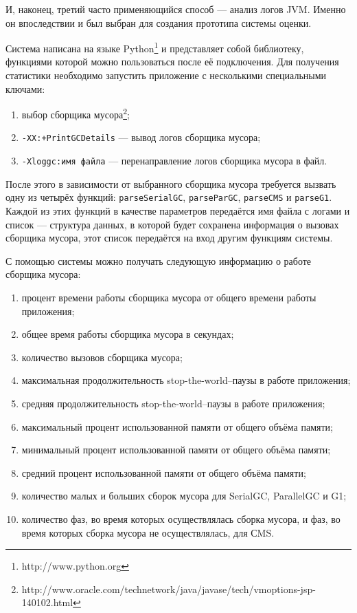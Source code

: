 И, наконец, третий часто применяющийся способ --- анализ логов JVM. Именно он впоследствии
и был выбран для создания прототипа системы оценки.

Система написана на языке Python\footnote{http://www.python.org} и представляет собой
библиотеку, функциями которой можно пользоваться после её подключения. Для получения
статистики необходимо запустить приложение с несколькими специальными ключами: 

\begin{enumerate}
\item выбор сборщика мусора\footnote{http://www.oracle.com/technetwork/java/javase/tech/vmoptions-jsp-140102.html};
\item \texttt{-XX:+PrintGCDetails} --- вывод логов сборщика мусора;
\item \texttt{-Xloggc:имя файла} --- перенаправление логов сборщика мусора в файл.
\end{enumerate}

После этого в зависимости от выбранного сборщика мусора требуется вызвать одну из
четырёх функций: \texttt{parseSerialGC}, \texttt{parseParGC}, \texttt{parseCMS}
и \texttt{parseG1}. Каждой из этих функций в качестве параметров передаётся имя файла 
с логами и список --- структура данных, в которой будет сохранена информация о
вызовах сборщика мусора, этот список передаётся на вход другим функциям системы.

С помощью системы можно получать следующую информацию о работе сборщика мусора:
\begin{enumerate}
\item процент времени работы сборщика мусора от общего времени работы приложения;
\item общее время работы сборщика мусора в секундах;
\item количество вызовов сборщика мусора;
\item максимальная продолжительность stop-the-world--паузы в работе приложения;
\item средняя продолжительность stop-the-world--паузы в работе приложения;
\item максимальный процент использованной памяти от общего объёма памяти;
\item минимальный процент использованной памяти от общего объёма памяти;
\item средний процент использованной памяти от общего объёма памяти;
\item количество малых и больших сборок мусора для SerialGC, ParallelGC и G1;
\item количество фаз, во время которых осуществлялась сборка мусора, и фаз, во время
которых сборка мусора не осуществлялась, для СMS.
\end{enumerate}


